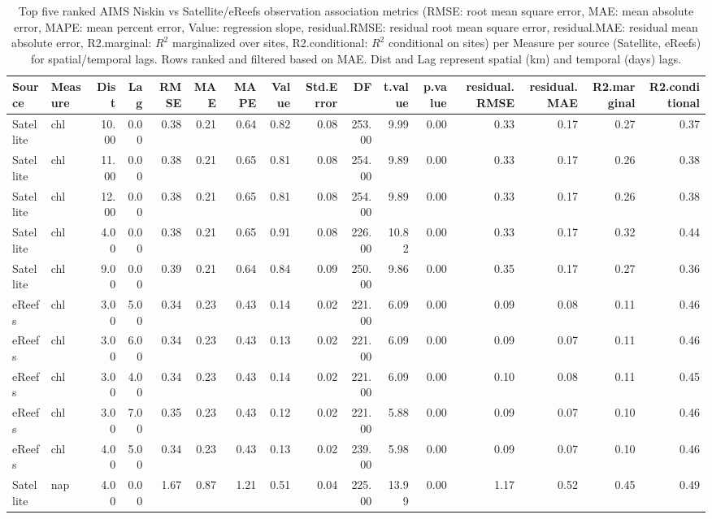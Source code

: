 \begin{table}[ht]
\centering
\caption{Top five ranked AIMS Niskin vs Satellite/eReefs observation association metrics (RMSE: root mean square error, MAE: mean absolute error, MAPE: mean percent error, Value: regression slope, residual.RMSE: residual root mean square error, residual.MAE: residual mean absolute error, R2.marginal: $R^2$ marginalized over sites, R2.conditional: $R^2$ conditional on sites) per Measure per source (Satellite, eReefs) for spatial/temporal lags.  Rows ranked and filtered based on MAE. Dist and Lag represent spatial (km) and temporal (days) lags.} 
\label{tab:comp.all.mae.sum.max}
\begingroup\scriptsize
\begin{tabular}{llrrrrrrrrrrrrrr}
  \toprule
Source & Measure & Dist & Lag & RMSE & MAE & MAPE & Value & Std.Error & DF & t.value & p.value & residual.RMSE & residual.MAE & R2.marginal & R2.conditional \\ 
  \midrule
Satellite & chl & 10.00 & 0.00 & 0.38 & 0.21 & 0.64 & 0.82 & 0.08 & 253.00 & 9.99 & 0.00 & 0.33 & 0.17 & 0.27 & 0.37 \\ 
  Satellite & chl & 11.00 & 0.00 & 0.38 & 0.21 & 0.65 & 0.81 & 0.08 & 254.00 & 9.89 & 0.00 & 0.33 & 0.17 & 0.26 & 0.38 \\ 
  Satellite & chl & 12.00 & 0.00 & 0.38 & 0.21 & 0.65 & 0.81 & 0.08 & 254.00 & 9.89 & 0.00 & 0.33 & 0.17 & 0.26 & 0.38 \\ 
  Satellite & chl & 4.00 & 0.00 & 0.38 & 0.21 & 0.65 & 0.91 & 0.08 & 226.00 & 10.82 & 0.00 & 0.33 & 0.17 & 0.32 & 0.44 \\ 
  Satellite & chl & 9.00 & 0.00 & 0.39 & 0.21 & 0.64 & 0.84 & 0.09 & 250.00 & 9.86 & 0.00 & 0.35 & 0.17 & 0.27 & 0.36 \\ 
  eReefs & chl & 3.00 & 5.00 & 0.34 & 0.23 & 0.43 & 0.14 & 0.02 & 221.00 & 6.09 & 0.00 & 0.09 & 0.08 & 0.11 & 0.46 \\ 
  eReefs & chl & 3.00 & 6.00 & 0.34 & 0.23 & 0.43 & 0.13 & 0.02 & 221.00 & 6.09 & 0.00 & 0.09 & 0.07 & 0.11 & 0.46 \\ 
  eReefs & chl & 3.00 & 4.00 & 0.34 & 0.23 & 0.43 & 0.14 & 0.02 & 221.00 & 6.09 & 0.00 & 0.10 & 0.08 & 0.11 & 0.45 \\ 
  eReefs & chl & 3.00 & 7.00 & 0.35 & 0.23 & 0.43 & 0.12 & 0.02 & 221.00 & 5.88 & 0.00 & 0.09 & 0.07 & 0.10 & 0.46 \\ 
  eReefs & chl & 4.00 & 5.00 & 0.34 & 0.23 & 0.43 & 0.13 & 0.02 & 239.00 & 5.98 & 0.00 & 0.09 & 0.07 & 0.10 & 0.46 \\ 
   \midrule
Satellite & nap & 4.00 & 0.00 & 1.67 & 0.87 & 1.21 & 0.51 & 0.04 & 225.00 & 13.99 & 0.00 & 1.17 & 0.52 & 0.45 & 0.49 \\ 

\end{tabular}
\end{table}
